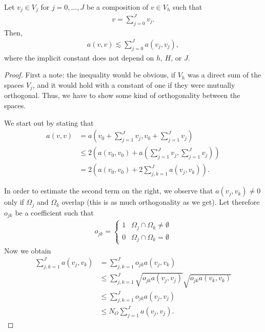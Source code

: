 \begin{lemma}
  \label{lemma:schwarz:6}
  Let $v_j\in V_j$ for $j=0,\dots,J$ be a composition of $v\in V_h$
  such that
  \begin{gather*}
    v=\sum_{j=0}^J v_j.
  \end{gather*}
  Then,
  \begin{gather}
    \label{eq:schwarz:12}
    a(v,v) \lesssim \sum_{j=0}^J a(v_j, v_j),
  \end{gather}
  where the implicit constant does not depend on $h$, $H$, or $J$.
\end{lemma}

\begin{proof}
  First a note: the inequality would be obvious, if $V_h$ was a direct
  sum of the spaces $V_j$, and it would hold with a constant of one if
  they were mutually orthogonal. Thus, we have to show some kind of
  orthogonality between the spaces.

  We start out by stating that
  \begin{align*}
    a(v,v) &= a\left(v_0+\sum_{j=1}^J v_j, v_0+\sum_{j=1}^J v_j\right)
    \\
    &\le 2 \left(a(v_0, v_0) + a\!\left(\sum_{j=1}^J v_j,\sum_{j=1}^J
        v_j\right)\right)
    \\
    &= 2 \left(a(v_0, v_0) + 2 \sum_{j,k=1}^J a(v_j,v_k)\right).
  \end{align*}

  In order to estimate the second term on the right, we observe that
  $a(v_j,v_k)\neq 0$ only if $\Omega_j$ and $\Omega_k$ overlap (this
  is as much orthogonality as we get). Let therefore $o_{j k}$ be a
  coefficient such that
  \begin{gather*}
    o_{j k} =
    \begin{cases}
      1 & \Omega_j \cap \Omega_k \neq \emptyset \\
      0 & \Omega_j \cap \Omega_k = \emptyset
    \end{cases}
  \end{gather*}
  Now we obtain
  \begin{align*}
    \sum_{j,k=1}^J a(v_j,v_k)
    &= \sum_{j,k=1}^J o_{j k}  a(v_j,v_k) \\
    & \le \sum_{j,k=1}^J \sqrt{o_{j k} a(v_j, v_j)} \sqrt{o_{j k} a(v_k,
      v_k)} \\
    & \le \sum_{j,k=1}^J o_{j k} a(v_j, v_j) \\
    & \le N_O \sum_{j=1}^J a(v_j, v_j).
  \end{align*}
\end{proof}


